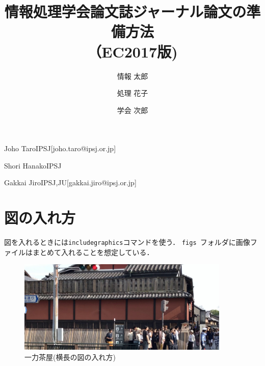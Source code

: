 \documentclass[submit,techreq]{ec2017}
\begin{document}
\title{情報処理学会論文誌ジャーナル論文の準備方法\\
（EC2017版)}





\author{情報 太郎}{Joho Taro}{IPSJ}[joho.taro@ipsj.or.jp]
\author{処理 花子}{Shori Hanako}{IPSJ}
\author{学会 次郎}{Gakkai Jiro}{IPSJ,JU}[gakkai.jiro@ipsj.or.jp]






\maketitle









%
\section{図の入れ方}

図を入れるときには{\tt includegraphics}コマンドを使う．
{\tt figs }フォルダに画像ファイルはまとめて入れることを想定している．

\begin{figure}
  \includegraphics[width=0.9\textwidth]{yoko.png}
  \caption{一力茶屋(横長の図の入れ方)}
  \label{fig:yoko}
\end{figure}
\end{document}
